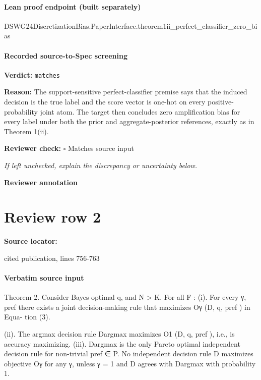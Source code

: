 \documentclass[10pt]{article}
\newcommand{\reviewerbox}{%
  \par\noindent\fbox{\parbox{0.96\linewidth}{\rule{0pt}{0.38in}}}\par
}
\newcommand{\reviewmatch}[1]{%
  \par\noindent\textbf{Reviewer check:} $\square$\; #1\par
  \noindent\emph{If left unchecked, explain the discrepancy or uncertainty below.}\par
}
\begin{document}
\paragraph{Lean proof endpoint (built separately)}\begin{ReviewVerbatim}
DSWG24DiscretizationBias.PaperInterface.theorem1ii_perfect_classifier_zero_bias
\end{ReviewVerbatim}

\paragraph{Recorded source-to-Spec screening}
\textbf{Verdict:} \texttt{matches}
\\
{\raggedright
\textbf{Reason:} The support-\allowbreak{}sensitive perfect-\allowbreak{}classifier premise says that the induced decision is the true label and the score vector is one-\allowbreak{}hot on every positive-\allowbreak{}probability joint atom.\allowbreak{} The target then concludes zero amplification bias for every label under both the prior and aggregate-\allowbreak{}posterior references, exactly as in Theorem 1(ii).\allowbreak{}
\par}
\reviewmatch{Matches source input}
\noindent\textbf{Reviewer annotation}\par
\reviewerbox
\clearpage
\hypertarget{source-claim-61c8bcc1f7628e92}{}
\section*{Review row 2}
\textbf{Source locator:} {\footnotesize\raggedright cited publication, lines 756-\allowbreak{}763\par}
\paragraph{Verbatim source input}
\begin{ReviewVerbatim}
Theorem 2. Consider Bayes optimal q, and N > K. For all F :
   (i). For every γ, pref there exists a joint decision-making rule that maximizes Oγ (D, q, pref ) in Equa-
        tion (3).

  (ii). The argmax decision rule Dargmax maximizes O1 (D, q, pref ), i.e., is accuracy maximizing.
 (iii). Dargmax is the only Pareto optimal independent decision rule for non-trivial pref ∈ P. No independent
        decision rule D maximizes objective Oγ for any γ, unless γ = 1 and D agrees with Dargmax with
        probability 1.
\end{ReviewVerbatim}
\end{document}
